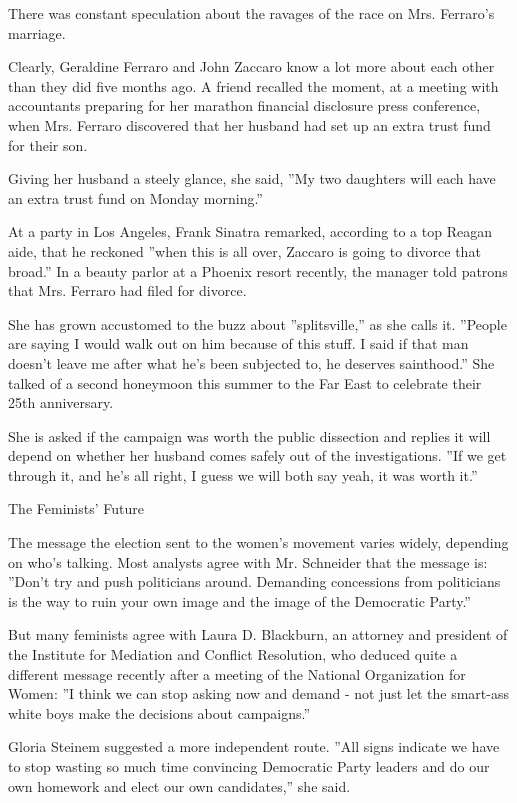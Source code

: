 There was constant speculation about the ravages of the race on Mrs.
Ferraro's marriage.

Clearly, Geraldine Ferraro and John Zaccaro know a lot more about each
other than they did five months ago. A friend recalled the moment, at a
meeting with accountants preparing for her marathon financial disclosure
press conference, when Mrs. Ferraro discovered that her husband had set
up an extra trust fund for their son.

Giving her husband a steely glance, she said, ''My two daughters will
each have an extra trust fund on Monday morning.''

At a party in Los Angeles, Frank Sinatra remarked, according to a top
Reagan aide, that he reckoned ''when this is all over, Zaccaro is going
to divorce that broad.'' In a beauty parlor at a Phoenix resort
recently, the manager told patrons that Mrs. Ferraro had filed for
divorce.

She has grown accustomed to the buzz about ''splitsville,'' as she calls
it. ''People are saying I would walk out on him because of this stuff. I
said if that man doesn't leave me after what he's been subjected to, he
deserves sainthood.'' She talked of a second honeymoon this summer to
the Far East to celebrate their 25th anniversary.

She is asked if the campaign was worth the public dissection and replies
it will depend on whether her husband comes safely out of the
investigations. ''If we get through it, and he's all right, I guess we
will both say yeah, it was worth it.''

The Feminists' Future

The message the election sent to the women's movement varies widely,
depending on who's talking. Most analysts agree with Mr. Schneider that
the message is: ''Don't try and push politicians around. Demanding
concessions from politicians is the way to ruin your own image and the
image of the Democratic Party.''

But many feminists agree with Laura D. Blackburn, an attorney and
president of the Institute for Mediation and Conflict Resolution, who
deduced quite a different message recently after a meeting of the
National Organization for Women: ''I think we can stop asking now and
demand - not just let the smart-ass white boys make the decisions about
campaigns.''

Gloria Steinem suggested a more independent route. ''All signs indicate
we have to stop wasting so much time convincing Democratic Party leaders
and do our own homework and elect our own candidates,'' she said.


